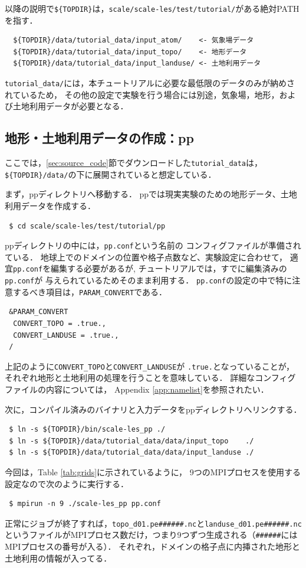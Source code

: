 以降の説明で\verb|${TOPDIR}|は，\verb|scale/scale-les/test/tutorial/|がある絶対PATHを指す．

\begin{verbatim}
  ${TOPDIR}/data/tutorial_data/input_atom/    <- 気象場データ
  ${TOPDIR}/data/tutorial_data/input_topo/    <- 地形データ
  ${TOPDIR}/data/tutorial_data/input_landuse/ <- 土地利用データ
\end{verbatim}
\verb|tutorial_data/|には，本チュートリアルに必要な最低限のデータのみが納めされているため，
その他の設定で実験を行う場合には別途，気象場，地形，および土地利用データが必要となる．



\subsection{地形・土地利用データの作成：pp}

ここでは，\ref{sec:source_code}節でダウンロードした\verb|tutorial_data|は，
\verb|${TOPDIR}/data/|の下に展開されていると想定している．

まず，ppディレクトリへ移動する．
ppでは現実実験のための地形データ、土地利用データを作成する．
\begin{verbatim}
 $ cd scale/scale-les/test/tutorial/pp
\end{verbatim}
ppディレクトリの中には，\verb|pp.conf|という名前の
コンフィグファイルが準備されている．
地球上でのドメインの位置や格子点数など、実験設定に合わせて，
適宜\verb|pp.conf|を編集する必要があるが,
チュートリアルでは，すでに編集済みの\verb|pp.conf|が
与えられているためそのまま利用する．
\verb|pp.conf|の設定の中で特に注意するべき項目は，\verb|PARAM_CONVERT|である．
\begin{verbatim}
 &PARAM_CONVERT
  CONVERT_TOPO = .true.,
  CONVERT_LANDUSE = .true.,
 /
\end{verbatim}
上記のように\verb|CONVERT_TOPO|と\verb|CONVERT_LANDUSE|が
\verb|.true.|となっていることが，
それぞれ地形と土地利用の処理を行うことを意味している．
詳細なコンフィグファイルの内容については，
Appendix \ref{app:namelist}を参照されたい．

次に，コンパイル済みのバイナリと入力データをppディレクトリへリンクする．
\begin{verbatim}
 $ ln -s ${TOPDIR}/bin/scale-les_pp ./
 $ ln -s ${TOPDIR}/data/tutorial_data/data/input_topo    ./
 $ ln -s ${TOPDIR}/data/tutorial_data/data/input_landuse ./
\end{verbatim}
今回は，Table \ref{tab:grids}に示されているように，
9つのMPIプロセスを使用する設定なので次のように実行する．
\begin{verbatim}
 $ mpirun -n 9 ./scale-les_pp pp.conf
\end{verbatim}
正常にジョブが終了すれば，\verb|topo_d01.pe######.nc|と\verb|landuse_d01.pe######.nc|というファイルがMPIプロセス数だけ，つまり9つずつ生成される（\verb|######|にはMPIプロセスの番号が入る）．
それぞれ，ドメインの格子点に内挿された地形と土地利用の情報が入ってる．

